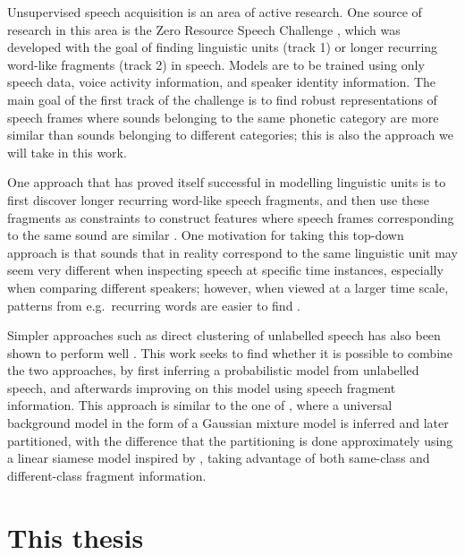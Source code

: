 Unsupervised speech acquisition is an area of active research.
One source of research in this area is the Zero Resource Speech Challenge \parencite{versteegh2015zero}, which was developed with the goal of finding linguistic units (track 1) or longer recurring word-like fragments (track 2) in speech.
Models are to be trained using only speech data, voice activity information, and speaker identity information.
The main goal of the first track of the challenge is to find robust representations of speech frames where sounds belonging to the same phonetic category are more similar than sounds belonging to different categories; this is also the approach we will take in this work.

One approach that has proved itself successful in modelling linguistic units is to first discover longer recurring word-like speech fragments, and then use these fragments as constraints to construct features where speech frames corresponding to the same sound are similar \parencite{synnaeve2014phonetics,thiolliere2015hybrid}.
One motivation for taking this top-down approach is that sounds that in reality correspond to the same linguistic unit may seem very different when inspecting speech at specific time instances, especially when comparing different speakers; however, when viewed at a larger time scale, patterns from e.g.\ recurring words are easier to find \parencite{jansen2013weak}.

Simpler approaches such as direct clustering of unlabelled speech has also been shown to perform well \parencite{chen2015parallel}.
This work seeks to find whether it is possible to combine the two approaches, by first inferring a probabilistic model from unlabelled speech, and afterwards improving on this model using speech fragment information.
This approach is similar to the one of \textcite{jansen2013weak}, where a universal background model in the form of a Gaussian mixture model is inferred and later partitioned, with the difference that the partitioning is done approximately using a linear siamese model inspired by \textcite{synnaeve2014phonetics}, taking advantage of both same-class and different-class fragment information.



\section{This thesis}

